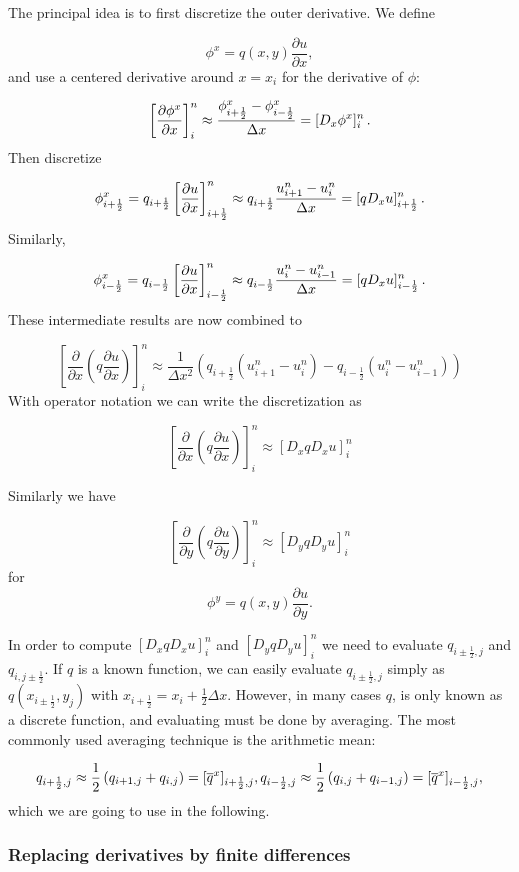\documentclass[letterpaper,10pt,english]{/usr/share/sphinx/texinputs/sphinxhowto}
\begin{document}
The principal idea is to first discretize the outer derivative. We
define

\[
\phi^x = q(x,y)
\frac{\partial u}{\partial x},
\] and use a centered derivative around $x=x_i$ for the derivative of
$\phi$:

\[
\left[\frac{\partial\phi^x}{\partial x}\right]^n_i
\approx \frac{\phi^x_{i+\frac{1}{2}} - \phi^x_{i-\frac{1}{2}}}{\Delta x}
= [D_x\phi^x]^n_i
\thinspace .
\] Then discretize

\[
\phi^x_{i+\frac{1}{2}}  = q_{i+\frac{1}{2}}
\left[\frac{\partial u}{\partial x}\right]^n_{i+\frac{1}{2}}
\approx q_{i+\frac{1}{2}} \frac{u^n_{i+1} - u^n_{i}}{\Delta x}
= [q D_x u]_{i+\frac{1}{2}}^n
\thinspace .
\] Similarly,

\[
\phi^x_{i-\frac{1}{2}}  = q_{i-\frac{1}{2}}
\left[\frac{\partial u}{\partial x}\right]^n_{i-\frac{1}{2}}
\approx q_{i-\frac{1}{2}} \frac{u^n_{i} - u^n_{i-1}}{\Delta x}
= [q D_x u]_{i-\frac{1}{2}}^n
\thinspace .
\] These intermediate results are now combined to

\[
\left[
     \frac{\partial}{\partial x}\left( q
     \frac{\partial u}{\partial x}\right)\right]^n_i
     \approx \frac{1}{\Delta x^2}
     \left( q_{i+\frac{1}{2}} \left({u^n_{i+1} - u^n_{i}}\right)
     - q_{i-\frac{1}{2}} \left({u^n_{i} - u^n_{i-1}}\right)\right)
\] With operator notation we can write the discretization as

\[
\left[
     \frac{\partial}{\partial x}\left( q
     \frac{\partial u}{\partial x}\right)\right]^n_i
     \approx [D_xq D_x u]^n_i
\]

Similarly we have

\[
\left[
     \frac{\partial}{\partial y}\left( q
     \frac{\partial u}{\partial y}\right)\right]^n_i
     \approx [D_yq D_y u]^n_i
\] for \[
\phi^y = q(x,y)
\frac{\partial u}{\partial y}.
\]

In order to compute $[D_xq D_x u]^n_i$ and $[D_yq D_y u]^n_i$ we need to
evaluate $q_{i\pm\frac{1}{2},j}$ and $q_{i,j\pm\frac{1}{2}}$. If $q$ is
a known function, we can easily evaluate $q_{i\pm\frac{1}{2},j}$ simply
as $q(x_{i\pm\frac{1}{2}},y_j)$ with
$x_{i+\frac{1}{2}} = x_i + \frac{1}{2}\Delta x$. However, in many cases
$q$, is only known as a discrete function, and evaluating must be done
by averaging. The most commonly used averaging technique is the
arithmetic mean:

\[
q_{i+\frac{1}{2},j} \approx
     \frac{1}{2}\left(q_{i+1,j}+ q_{i,j}\right) =
     [\overline{q}^{x}]_{i+\frac{1}{2},j},\\
q_{i-\frac{1}{2},j} \approx
     \frac{1}{2}\left(q_{i,j}+ q_{i-1,j}\right) =
     [\overline{q}^{x}]_{i-\frac{1}{2},j},  
\] which we are going to use in the following.\subsubsection{Replacing derivatives by finite differences}
\end{document}
